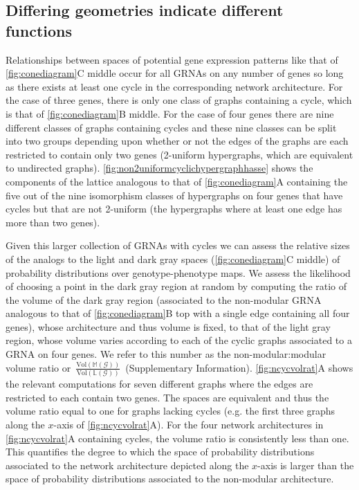 
\subsection{Differing geometries indicate different functions}
Relationships between spaces of potential gene expression patterns like that of \ref{fig:conediagram}C middle occur for all GRNAs on any number of genes so long as there exists at least one cycle in the corresponding network architecture. For the case of three genes, there is only one class of graphs containing a cycle, which is that of \ref{fig:conediagram}B middle. For the case of four genes there are nine different classes of graphs containing cycles and these nine classes can be split into two groups depending upon whether or not the edges of the graphs are each restricted to contain only two genes (2-uniform hypergraphs, which are equivalent to undirected graphs). \ref{fig:non2uniformcyclichypergraphhasse} shows the components of the lattice analogous to that of \ref{fig:conediagram}A containing the five out of the nine isomorphism classes of hypergraphs on four genes that have cycles but that are not 2-uniform (the hypergraphs where at least one edge has more than two genes).

Given this larger collection of GRNAs with cycles we can assess the relative sizes of the analogs to the light and dark gray spaces (\ref{fig:conediagram}C middle) of probability distributions over genotype-phenotype maps. We assess the likelihood of choosing a point in the dark gray region at random by computing the ratio of the volume of the dark gray region (associated to the non-modular GRNA analogous to that of \ref{fig:conediagram}B top with a single edge containing all four genes), whose architecture and thus volume is fixed, to that of the light gray region, whose volume varies according to each of the cyclic graphs associated to a GRNA on four genes. We refer to this number as the non-modular:modular volume ratio or~$\frac{\text{Vol}(\mathbb{M}(\mathcal{G}))}{\text{Vol}(\mathbb{L}(\mathcal{G}))}$~(Supplementary Information). \ref{fig:ncycvolrat}A shows the relevant computations for seven different graphs where the edges are restricted to each contain two genes. The spaces are equivalent and thus the volume ratio equal to one for graphs lacking cycles (e.g. the first three graphs along the $x$-axis of \ref{fig:ncycvolrat}A). For the four network architectures in \ref{fig:ncycvolrat}A containing cycles, the volume ratio is consistently less than one. This quantifies the degree to which the space of probability distributions associated to the network architecture depicted along the $x$-axis is larger than the space of probability distributions associated to the non-modular architecture.

